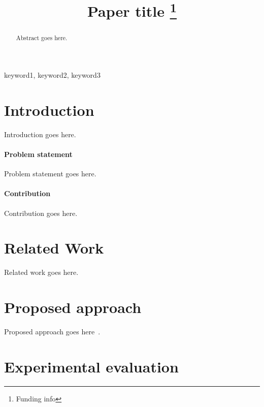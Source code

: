 \documentclass[conference]{IEEEtran}
\begin{document}
\title{Paper title
\thanks{
    Funding info
}
}


\author{
}


\maketitle

\begin{abstract}
Abstract goes here.

\end{abstract}

\begin{IEEEkeywords}
keyword1, keyword2, keyword3
\end{IEEEkeywords}

\section{Introduction}\label{sec:introduction}

Introduction goes here.

\paragraph{Problem statement}
Problem statement goes here.

\paragraph{Contribution}
Contribution goes here.

\section{Related Work}
\label{sec:state-of-the-art}

Related work goes here.
\section{Proposed approach}
\label{sec:proposed-approach}

Proposed approach goes here~\cite{DBLP:conf/dsrt/ShaiakhmetovPVP24}.

\section{Experimental evaluation}
\label{sec:experimental-evaluation}
\end{document}
